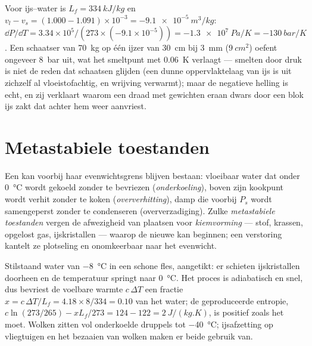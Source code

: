 \begin{example}\label{ex:b1:phase-changes:skate}
Voor ijs--water is $L_f = \qty{334}{kJ/kg}$ en $v_l - v_s = (1.000 - 1.091)
\times 10^{-3} = \qty{-9.1e-5}{m^3/kg}$: $\dd P/\dd T = 3.34 \times 10^5/(273 \times
(-9.1 \times 10^{-5})) = \qty{-1.3e7}{Pa/K} = \qty{-130}{bar/K}$. Een schaatser van \qty{70}{kg}
op één ijzer van \qty{30}{cm} bij \qty{3}{mm} ($\qty{9}{cm^2}$) oefent
ongeveer \qty{8}{bar} uit, wat het smeltpunt met \qty{0.06}{K} verlaagt --- smelten door druk is niet de reden dat schaatsen glijden (een dunne
oppervlaktelaag van ijs is uit zichzelf al vloeistofachtig, en wrijving verwarmt);
maar de negatieve helling is echt, en zij verklaart waarom een draad met
gewichten eraan dwars door een blok ijs zakt dat achter hem weer aanvriest.
\end{example}

\section{Metastabiele toestanden}

\begin{definition}\label{def:b1:phase-changes:metastable}
Een  kan voorbij haar evenwichtsgrens blijven bestaan: vloeibaar water
dat onder \qty{0}{\degreeCelsius} wordt gekoeld zonder te bevriezen (\emph{onderkoeling}),
boven zijn kookpunt wordt verhit zonder te koken (\emph{oververhitting}),
damp die voorbij $P_s$ wordt samengeperst zonder te condenseren (oververzadiging).
Zulke \emph{metastabiele toestanden} vergen de afwezigheid van plaatsen voor
\emph{kiemvorming} --- stof, krassen, opgelost gas, ijskristallen --- waarop de
nieuwe  kan beginnen; een verstoring kantelt ze plotseling en onomkeerbaar
naar het evenwicht.
\end{definition}

\begin{example}\label{ex:b1:phase-changes:supercooled}
Stilstaand water van \qty{-8}{\degreeCelsius} in een schone fles, aangetikt: er
schieten ijskristallen doorheen en de temperatuur springt naar
\qty{0}{\degreeCelsius}. Het proces is adiabatisch en snel, dus bevriest de voelbare
warmte $c\,\Delta T$ een fractie $x = c\,\Delta T/L_f = 4.18 \times 8/334 =
0.10$ van het water; de geproduceerde entropie, $c\ln(273/265) - xL_f/273 =
124 - 122 = \qty{+2}{J/(kg.K)}$, is positief zoals het moet. Wolken zitten
vol onderkoelde druppels tot \qty{-40}{\degreeCelsius}; ijsafzetting op
vliegtuigen en het bezaaien van wolken maken er beide gebruik van.
\end{example}

